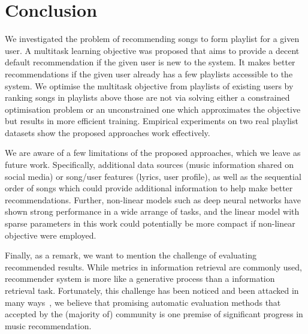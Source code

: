 \section{Conclusion}
We investigated the problem of recommending songs to form playlist for a given user.
A multitask learning objective was proposed that aims to provide a decent default recommendation 
if the given user is new to the system.
It makes better recommendations if the given user already has a few playlists accessible to the system.
We optimise the multitask objective from playlists of existing users by ranking songs in playlists above those are not
via solving either a constrained optimisation problem or an unconstrained one which approximates the objective but 
results in more efficient training.
Empirical experiments on two real playlist datasets show the proposed approaches work effectively.





We are aware of a few limitations of the proposed approaches, which we leave as future work.
Specifically, additional data sources (\eg music information shared on social media) or song/user 
features (\eg lyrics, user profile), as well as the sequential order of songs which could provide 
additional information to help make better recommendations.
Further, non-linear models such as deep neural networks have shown strong performance in a wide arrange of tasks,
and the linear model with sparse parameters in this work could potentially be more compact if non-linear objective were employed.

Finally, as a remark, we want to mention the challenge of evaluating recommended results.
While metrics in information retrieval are commonly used, recommender system is more like a generative process
than a information retrieval task. Fortunately, this challenge has been noticed and been attacked in many 
ways~\cite{mcfee2011natural,mcfee2012hypergraph,schedl2017}, 
we believe that promising automatic evaluation methods that accepted by the (majority of) 
community is one premise of significant progress in music recommendation.
